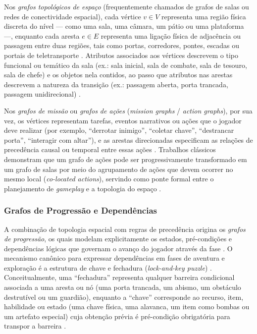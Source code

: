 Nos \textit{grafos topológicos de espaço} (frequentemente chamados de grafos de salas ou redes de conectividade espacial), cada vértice $v \in V$ representa uma região física discreta do nível --- como uma sala, uma câmara, um pátio ou uma plataforma ---, enquanto cada aresta $e \in E$ representa uma ligação física de adjacência ou passagem entre duas regiões, tais como portas, corredores, pontes, escadas ou portais de teletransporte \cite{dormans2010, linden2014dungeons, summerville2018procedural}. Atributos associados aos vértices descrevem o tipo funcional ou temático da sala (ex.: sala inicial, sala de combate, sala de tesouro, sala de chefe) e os objetos nela contidos, ao passo que atributos nas arestas descrevem a natureza da transição (ex.: passagem aberta, porta trancada, passagem unidirecional) \cite{linden2014dungeons, xu2025databasedrivenframework3dlevel}.

Nos \textit{grafos de missão} ou \textit{grafos de ações} (\textit{mission graphs} / \textit{action graphs}), por sua vez, os vértices representam tarefas, eventos narrativos ou ações que o jogador deve realizar (por exemplo, ``derrotar inimigo'', ``coletar chave'', ``destrancar porta'', ``interagir com altar''), e as arestas direcionadas especificam as relações de precedência causal ou temporal entre essas ações \cite{dormans2010, inproceedings}. Trabalhos clássicos demonstram que um grafo de ações pode ser progressivamente transformado em um grafo de salas por meio do agrupamento de ações que devem ocorrer no mesmo local (\textit{co-located actions}), servindo como ponte formal entre o planejamento de \textit{gameplay} e a topologia do espaço \cite{inproceedings, linden2014dungeons}.

\subsubsection{Grafos de Progressão e Dependências}
\label{sec:grafos_progressao}

A combinação de topologia espacial com regras de precedência origina os \textit{grafos de progressão}, os quais modelam explicitamente os estados, pré-condições e dependências lógicas que governam o avanço do jogador através da fase \cite{dormans2010, inproceedings, linden2014dungeons, xu2025databasedrivenframework3dlevel}. O mecanismo canônico para expressar dependências em fases de aventura e exploração é a estrutura de chave e fechadura (\textit{lock-and-key puzzle}) \cite{dormans2010, linden2014dungeons, xu2025databasedrivenframework3dlevel}. Conceitualmente, uma ``fechadura'' representa qualquer barreira condicional associada a uma aresta ou nó (uma porta trancada, um abismo, um obstáculo destrutível ou um guardião), enquanto a ``chave'' corresponde ao recurso, item, habilidade ou estado (uma chave física, uma alavanca, um item como bombas ou um artefato especial) cuja obtenção prévia é pré-condição obrigatória para transpor a barreira \cite{dormans2010, inproceedings, shaker2016constructive}.

